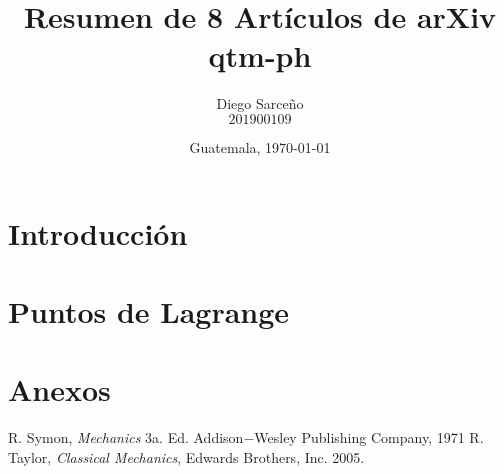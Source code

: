 





\title{\sc Resumen de 8 Artículos de arXiv qtm-ph}%
\author{Diego Sarceño \\ $201900109$}
\date{Guatemala, \today}

  
\maketitle

\begin{abstract}
  \lipsum[1]
\end{abstract}


\section{Introducción}
\label{sec:intro}
\justify 
\lipsum[1]	


\section{Puntos de Lagrange}
\justify
\lipsum[1-5]



\section{Anexos}
\label{sec:anexos}





\nocite{*}
%
%

\begin{thebibliography}{00}
 R. Symon, \textit{Mechanics} 3a. Ed. Addison$-$Wesley Publishing Company, 1971
 R. Taylor, \textit{Classical Mechanics}, Edwards Brothers, Inc. 2005.
\end{thebibliography}







